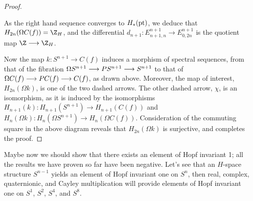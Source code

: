 \begin{proof}
\begin{center}
\end{center}
As the right hand sequence converges to $H_*(\mathrm{pt})$, we deduce that $H_{2n}(\Omega C(f))=\Z_H$, and the differential $d_{n+1}:E^{n+1}_{n+1,n}\to E^{n+1}_{0,2n}$ is the quotient map $\Z\to\Z_H$.

Now the map $k:S^{n+1}\to C(f)$ induces a morphism of spectral sequences,  from that of the fibration $\Omega S^{n+1} \longrightarrow PS^{n+1} \longrightarrow S^{n+1}$ to that of $\Omega C(f) \longrightarrow PC(f) \longrightarrow C(f)$, as drawn above. Moreover, the map of interest, $H_{2n}(\Omega k)$, is one of the two dashed arrows. The other dashed arrow, $\chi$, is an isomorphism, as it is induced by the isomorphisms $H_{n+1}(k):H_{n+1}(S^{n+1})\to H_{n+1}(C(f))$ and $H_{n}(\Omega k):H_n(\Omega S^{n+1})\to H_n(\Omega C(f))$. Consideration of the commuting square in the above diagram reveals that $H_{2n}(\Omega k)$ is surjective, and completes the proof.
\end{proof}

Maybe now we should show that there exists an element of Hopf invariant 1; all the results we have proven so far have been negative.  Let's see that an $H$-space structure $S^{n-1}$ yields an element of Hopf invariant one on $S^n$, then real, complex, quaternionic, and Cayley multiplication will provide elements of Hopf invariant one on $S^1$, $S^2$, $S^4$, and $S^8$.

